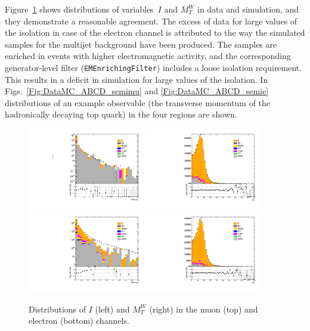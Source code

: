 Figure~\ref{Fig:DataMC_reliso_mtw} shows distributions of variables~$I$ and $M_{T}^W$ in data and simulation, and they demonstrate a reasonable agreement.
The excess of data for large values of the isolation in case of the electron channel is attributed to the way the simulated samples for the multijet background have been produced.
The samples are enriched in events with higher electromagnetic activity, and the corresponding generator-level filter (\texttt{EMEnrichingFilter}) includes a loose isolation requirement.
This results in a deficit in simulation for large values of the isolation.
In Figs.~\ref{Fig:DataMC_ABCD_semimu} and \ref{Fig:DataMC_ABCD_semie} distributions of an example observable (the transverse momentum of the hadronically decaying top quark) in the four regions are shown.

\begin{figure}
  \centering
  \includegraphics[width=0.45\textwidth]{fig/chapt6/normalisation/dataMC_reliso_semimu.pdf}
  \includegraphics[width=0.45\textwidth]{fig/chapt6/normalisation/dataMC_mTW_semimu.pdf} \\
  \includegraphics[width=0.45\textwidth]{fig/chapt6/normalisation/dataMC_reliso_semie.pdf}
  \includegraphics[width=0.45\textwidth]{fig/chapt6/normalisation/dataMC_mTW_semie.pdf}
  \caption{Distributions of $I$ (left) and $M_{T}^W$ (right) in the muon (top) and electron (bottom) channels.}
  \label{Fig:DataMC_reliso_mtw}
\end{figure}

